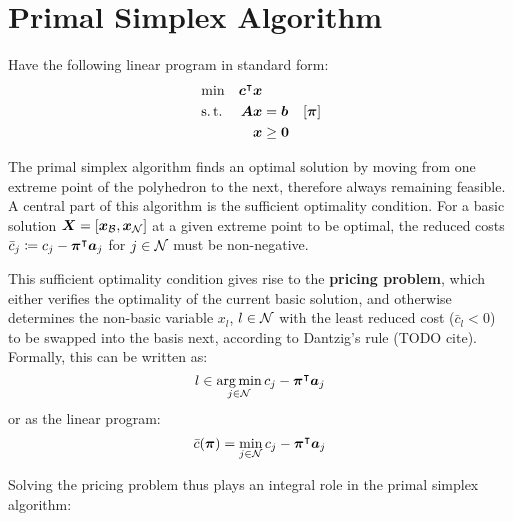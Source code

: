\section{Primal Simplex Algorithm}\label{sec:preliminaries_psa}
Have the following linear program in standard form:
\begin{equation}\label{eq:lp_standard}
\begin{aligned}
&\min & {\bm{c}}^\intercal {\bm{x}} & & \\
&\operatorname{s.t.} & {\bm{A}} {\bm{x}} & = {\bm{b}} & \left[{\bm{\pi}}\right] \\
&& {\bm{x}} & \geq {\bm{0}} &
\end{aligned}
\end{equation}

The primal simplex algorithm finds an optimal solution by moving from one extreme point of the polyhedron to the next, therefore always remaining feasible. A central part of this algorithm is the sufficient optimality condition. For a basic solution ${\bm{X}} = \left[{\bm{x}}_{\mathcal{B}}, {\bm{x}}_{\mathcal{N}}\right]$ at a given extreme point to be optimal, the reduced costs $\bar{c}_j \coloneqq c_j - {\bm{\pi}}^\intercal {\bm{a}}_j$ for $j \in \mathcal{N}$ must be non-negative.

This sufficient optimality condition gives rise to the \textbf{pricing problem}, which either verifies the optimality of the current basic solution, and otherwise determines the non-basic variable $x_l$, $l \in \mathcal{N}$ with the least reduced cost ($\bar{c}_l < 0$) to be swapped into the basis next, according to Dantzig's rule (TODO cite). Formally, this can be written as:
\begin{equation}
l \in \underset{j \in \mathcal{N}}{\arg\min} \, c_j - {\bm{\pi}}^\intercal {\bm{a}}_j
\end{equation}
or as the linear program:
\begin{equation}\label{eq:psa_pp}
\bar{c}({\bm{\pi}}) = \underset{j \in \mathcal{N}}{\min} \, c_j - {\bm{\pi}}^\intercal {\bm{a}}_j
\end{equation}

Solving the pricing problem thus plays an integral role in the primal simplex algorithm:

